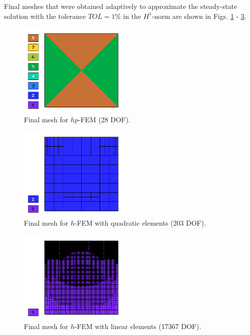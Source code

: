 \documentclass[final,3p,times,twocolumn]{elsarticle}
\begin{document}
Final meshes that were obtained adaptively to approximate the steady-state 
solution with the tolerance $TOL = 1 \%$ in the $H^1$-norm are shown in 
Figs. \ref{fig:final-meshes-1} - \ref{fig:final-meshes-3}.
\begin{figure}[!ht]
\begin{center}
\includegraphics[height=4.5cm]{mesh_final_hp.png}
\end{center}
\vspace{-6mm}
\caption{Final mesh for $hp$-FEM (28 DOF).}
\label{fig:final-meshes-1}
\end{figure}

\begin{figure}[!ht]
\begin{center}
\includegraphics[height=4.5cm]{mesh_final_h2.png}
\end{center}
\vspace{-6mm}
\caption{Final mesh for $h$-FEM with quadratic elements (203 DOF).}
\label{fig:final-meshes-2}
\end{figure}

\begin{figure}[!ht]
\begin{center}
\includegraphics[height=4.5cm]{mesh_final_h1.png}
\end{center}
\vspace{-6mm}
\caption{Final mesh for $h$-FEM with linear elements (17367 DOF).}
\label{fig:final-meshes-3}
\end{figure}
\end{document}
